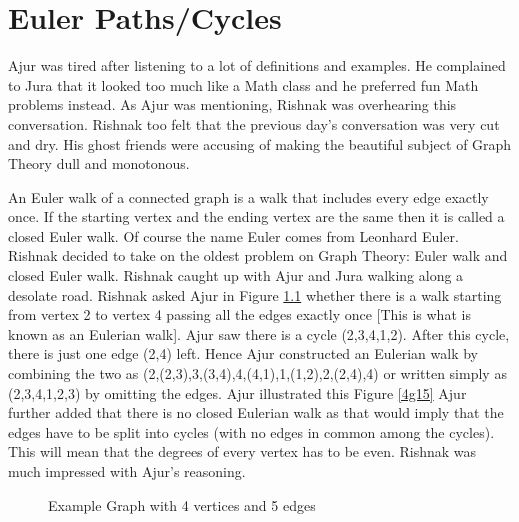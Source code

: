 \chapter{Euler Paths/Cycles}

Ajur was tired after listening to a lot of definitions and examples. He complained to Jura that it looked too much like a Math class and he preferred fun Math problems instead. As Ajur was mentioning, Rishnak was overhearing this conversation. Rishnak too felt that the previous day's conversation was very cut and dry. His ghost friends were accusing of making the beautiful subject of Graph Theory dull and monotonous.


An Euler walk of a connected graph is a walk that includes every edge exactly once. If the starting vertex and the ending vertex are the same then it is called a closed Euler walk. Of course the name Euler comes from Leonhard Euler.
Rishnak decided to take on the oldest problem on Graph Theory: Euler walk and closed Euler walk. Rishnak caught up with Ajur and Jura walking along a desolate road. Rishnak asked Ajur in  Figure \ref{4g1} whether there is a walk starting from vertex 2 to vertex 4 passing all the edges exactly once [This is what is known as an Eulerian walk]. Ajur saw there is a cycle (2,3,4,1,2). After this cycle, there is just one edge (2,4) left. Hence Ajur constructed an Eulerian walk by combining the two as (2,(2,3),3,(3,4),4,(4,1),1,(1,2),2,(2,4),4) or written simply as (2,3,4,1,2,3) by omitting the edges. Ajur illustrated this Figure \ref{4g15} Ajur further added that there is no closed Eulerian walk as that would imply that the edges have to be split into cycles (with no edges in common among the cycles). This will mean that the degrees of every vertex has to be even. Rishnak was much impressed with Ajur's reasoning. 


\begin{figure}
\begin{center}
\caption{ Example Graph with 4 vertices and 5 edges}\label{4g1}
\end{center}
\end{figure}

